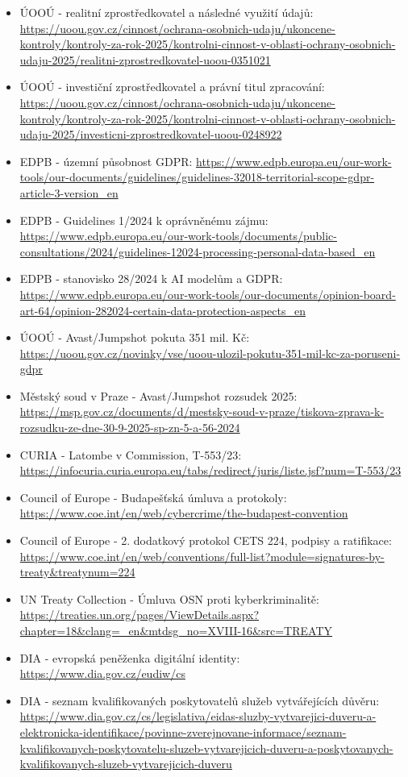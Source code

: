 \documentclass[11pt,a4paper]{article}
\begin{document}
\begin{itemize}
  \item ÚOOÚ - realitní zprostředkovatel a následné využití údajů: \url{https://uoou.gov.cz/cinnost/ochrana-osobnich-udaju/ukoncene-kontroly/kontroly-za-rok-2025/kontrolni-cinnost-v-oblasti-ochrany-osobnich-udaju-2025/realitni-zprostredkovatel-uoou-0351021}
  \item ÚOOÚ - investiční zprostředkovatel a právní titul zpracování: \url{https://uoou.gov.cz/cinnost/ochrana-osobnich-udaju/ukoncene-kontroly/kontroly-za-rok-2025/kontrolni-cinnost-v-oblasti-ochrany-osobnich-udaju-2025/investicni-zprostredkovatel-uoou-0248922}
  \item EDPB - územní působnost GDPR: \url{https://www.edpb.europa.eu/our-work-tools/our-documents/guidelines/guidelines-32018-territorial-scope-gdpr-article-3-version_en}
  \item EDPB - Guidelines 1/2024 k oprávněnému zájmu: \url{https://www.edpb.europa.eu/our-work-tools/documents/public-consultations/2024/guidelines-12024-processing-personal-data-based_en}
  \item EDPB - stanovisko 28/2024 k AI modelům a GDPR: \url{https://www.edpb.europa.eu/our-work-tools/our-documents/opinion-board-art-64/opinion-282024-certain-data-protection-aspects_en}
  \item ÚOOÚ - Avast/Jumpshot pokuta 351 mil. Kč: \url{https://uoou.gov.cz/novinky/vse/uoou-ulozil-pokutu-351-mil-kc-za-poruseni-gdpr}
  \item Městský soud v Praze - Avast/Jumpshot rozsudek 2025: \url{https://msp.gov.cz/documents/d/mestsky-soud-v-praze/tiskova-zprava-k-rozsudku-ze-dne-30-9-2025-sp-zn-5-a-56-2024}
  \item CURIA - Latombe v Commission, T-553/23: \url{https://infocuria.curia.europa.eu/tabs/redirect/juris/liste.jsf?num=T-553/23}
  \item Council of Europe - Budapešťská úmluva a protokoly: \url{https://www.coe.int/en/web/cybercrime/the-budapest-convention}
  \item Council of Europe - 2. dodatkový protokol CETS 224, podpisy a ratifikace: \url{https://www.coe.int/en/web/conventions/full-list?module=signatures-by-treaty&treatynum=224}
  \item UN Treaty Collection - Úmluva OSN proti kyberkriminalitě: \url{https://treaties.un.org/pages/ViewDetails.aspx?chapter=18&clang=_en&mtdsg_no=XVIII-16&src=TREATY}
  \item DIA - evropská peněženka digitální identity: \url{https://www.dia.gov.cz/eudiw/cs}
  \item DIA - seznam kvalifikovaných poskytovatelů služeb vytvářejících důvěru: \url{https://www.dia.gov.cz/cs/legislativa/eidas-sluzby-vytvarejici-duveru-a-elektronicka-identifikace/povinne-zverejnovane-informace/seznam-kvalifikovanych-poskytovatelu-sluzeb-vytvarejicich-duveru-a-poskytovanych-kvalifikovanych-sluzeb-vytvarejicich-duveru}

\end{itemize}
\end{document}
